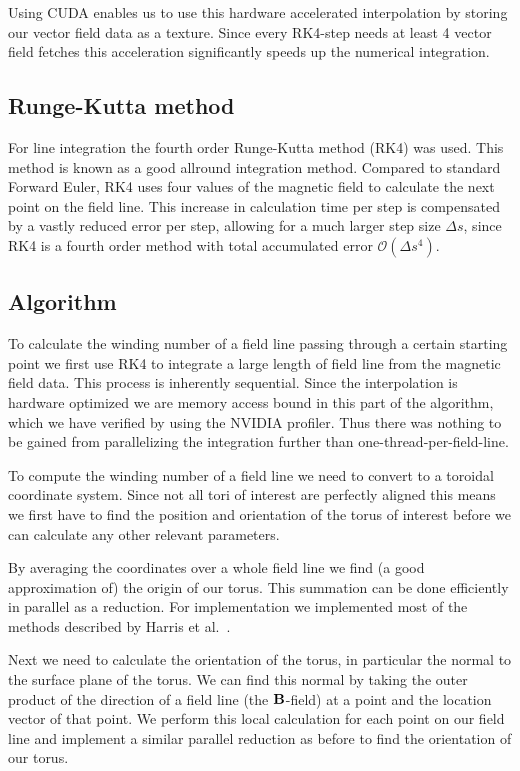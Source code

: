 \documentclass{article}
\renewcommand{\O}[1]{\ensuremath{\mathcal{O}\left(#1\right)}}
\renewcommand{\vec}{\bold}
\begin{document}
Using CUDA enables us to use this hardware accelerated interpolation by storing our vector field data as a texture. Since every RK4-step needs at least 4 vector field fetches this acceleration significantly speeds up the numerical integration. %

\subsection{Runge-Kutta method}
For line integration the fourth order Runge-Kutta method (RK4) was used.  This method is known as a good allround integration method. Compared to standard Forward Euler, RK4 uses four values of the magnetic field to calculate the next point on the field line. This increase in calculation time per step is compensated by a vastly reduced error per step, allowing for a much larger step size $\Delta s$, since RK4 is a fourth order method with total accumulated error $\O{\Delta s^4}$.

\subsection{Algorithm}
To calculate the winding number of a field line passing through a certain starting point we first use RK4 to integrate a large length of field line from the magnetic field data. This process is inherently sequential. Since the interpolation is hardware optimized we are memory access bound in this part of the algorithm, which we have verified by using the NVIDIA profiler. Thus there was nothing to be gained from parallelizing the integration further than one-thread-per-field-line.

To compute the winding number of a field line we need to convert to a toroidal coordinate system. Since not all tori of interest are perfectly aligned this means we first have to find the position and orientation of the torus of interest before we can calculate any other relevant parameters.

By averaging the coordinates over a whole field line we find (a good approximation of) the origin of our torus. This summation can be done efficiently in parallel as a reduction. For implementation we implemented most of the methods described by Harris et al.~\cite{harris2007optimizing}.

Next we need to calculate the orientation of the torus, in particular the normal to the surface plane of the torus. We can find this normal by taking the outer product of the direction of a field line (the $\vec{B}$-field) at a point and the location vector of that point. We perform this local calculation for each point on our field line and implement a similar parallel reduction as before to find the orientation of our torus.
\end{document}
